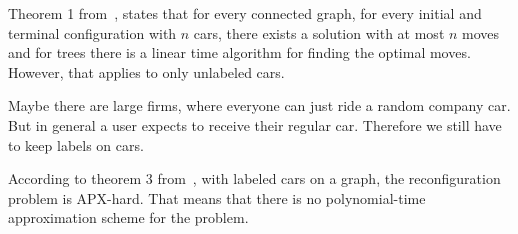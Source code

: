 Theorem 1 from~\cite{calinescu2008reconfigurations}, states that for every
connected graph, for every initial and terminal configuration with $n$ cars,
there exists a solution with at most $n$ moves and for trees there is a linear
time algorithm for finding the optimal moves. However, that applies to only
unlabeled cars.

Maybe there are large firms, where everyone can just ride a random company car.
But in general a user expects to receive their regular car. Therefore we still
have to keep labels on cars. 

According to theorem 3 from~\cite{calinescu2008reconfigurations}, with labeled
cars on a graph, the reconfiguration problem is APX-hard. That means that there
is no polynomial-time approximation scheme for the problem.
